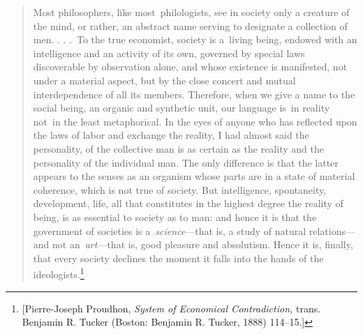 \documentclass[openany,nobib]{tufte-book}
\begin{document}
\begin{quote}
Most philosophers, like most~philologists, see in society only a
creature of the mind, or rather, an abstract name serving to designate a
collection of men. . . .~To the true economist, society is a~living
being, endowed with an intelligence and an activity of its own, governed
by special laws discoverable by observation alone, and whose existence
is manifested, not under a material aspect, but by the close concert and
mutual interdependence of all its members. Therefore, when we give a
name to the social being, an organic and synthetic unit, our language
is~in reality not~in the least metaphorical. In the eyes of anyone who
has reflected upon the laws of labor and exchange the reality, I had
almost said the personality, of the collective man is as certain as the
reality and the personality of the individual man. The only difference
is that the latter appears to the senses as an organism whose parts are
in a state of material coherence, which is not true of society. But
intelligence, spontaneity, development, life, all that constitutes in
the highest degree the reality of being, is as essential to society as
to man: and hence it is that the government of societies is
a~\emph{science}---that is, a study of natural relations---and not
an~\emph{art}---that is, good pleasure and absolutism. Hence it is,
finally, that every society declines the moment it falls into the hands
of the ideologists.\footnote{{[}Pierre-Joseph Proudhon, \emph{System of
  Economical Contradiction,} trans. Benjamin R. Tucker (Boston: Benjamin
  R. Tucker, 1888) 114--15.{]}}~
\end{quote}
\end{document}

